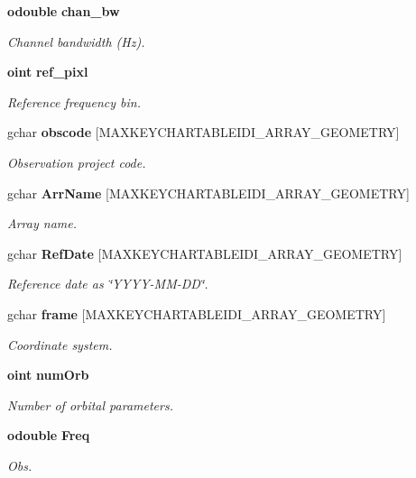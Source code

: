 \begin{CompactItemize}
{\bf odouble} {\bf chan\_\-bw}
\begin{CompactList}\small\item\em Channel bandwidth (Hz). \item\end{CompactList}\item 
{\bf oint} {\bf ref\_\-pixl}
\begin{CompactList}\small\item\em Reference frequency bin. \item\end{CompactList}\item 
gchar {\bf obscode} [MAXKEYCHARTABLEIDI\_\-ARRAY\_\-GEOMETRY]
\begin{CompactList}\small\item\em Observation project code. \item\end{CompactList}\item 
gchar {\bf Arr\-Name} [MAXKEYCHARTABLEIDI\_\-ARRAY\_\-GEOMETRY]
\begin{CompactList}\small\item\em Array name. \item\end{CompactList}\item 
gchar {\bf Ref\-Date} [MAXKEYCHARTABLEIDI\_\-ARRAY\_\-GEOMETRY]
\begin{CompactList}\small\item\em Reference date as \char`\"{}YYYY-MM-DD\char`\"{}. \item\end{CompactList}\item 
gchar {\bf frame} [MAXKEYCHARTABLEIDI\_\-ARRAY\_\-GEOMETRY]
\begin{CompactList}\small\item\em Coordinate system. \item\end{CompactList}\item 
{\bf oint} {\bf num\-Orb}
\begin{CompactList}\small\item\em Number of orbital parameters. \item\end{CompactList}\item 
{\bf odouble} {\bf Freq}
\begin{CompactList}\small\item\em Obs. \item\end{CompactList}\item 

\end{CompactItemize}
